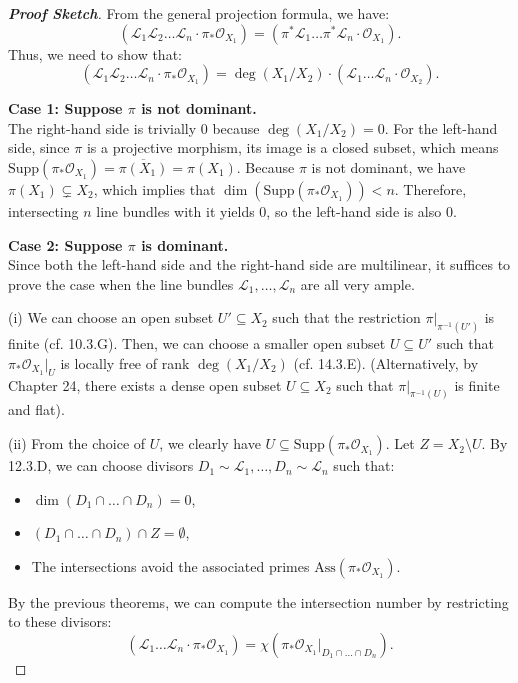 \begin{proof}[\textbf{Proof Sketch}]
From the general projection formula, we have:
\[
(\mathcal{L}_1 \mathcal{L}_2 \dots \mathcal{L}_n \cdot \pi_*\mathcal{O}_{X_1}) = (\pi^*\mathcal{L}_1 \dots \pi^*\mathcal{L}_n \cdot \mathcal{O}_{X_1}).
\]
Thus, we need to show that:
\[
(\mathcal{L}_1 \mathcal{L}_2 \dots \mathcal{L}_n \cdot \pi_*\mathcal{O}_{X_1}) = \deg(X_1/X_2) \cdot (\mathcal{L}_1 \dots \mathcal{L}_n \cdot \mathcal{O}_{X_2}).
\]


\textbf{Case 1: Suppose $\pi$ is not dominant.} \\
The right-hand side is trivially $0$ because $\deg(X_1/X_2) = 0$. For the left-hand side, since $\pi$ is a projective morphism, its image is a closed subset, which means $\text{Supp}(\pi_*\mathcal{O}_{X_1}) = \overline{\pi(X_1)} = \pi(X_1)$. Because $\pi$ is not dominant, we have $\pi(X_1) \subsetneq X_2$, which implies that $\dim(\text{Supp}(\pi_*\mathcal{O}_{X_1})) < n$. Therefore, intersecting $n$ line bundles with it yields $0$, so the left-hand side is also $0$.


\textbf{Case 2: Suppose $\pi$ is dominant.} \\
Since both the left-hand side and the right-hand side are multilinear, it suffices to prove the case when the line bundles $\mathcal{L}_1, \dots, \mathcal{L}_n$ are all very ample.

(i) We can choose an open subset $U' \subseteq X_2$ such that the restriction $\pi|_{\pi^{-1}(U')}$ is finite (cf. 10.3.G). Then, we can choose a smaller open subset $U \subseteq U'$ such that $\pi_*\mathcal{O}_{X_1}|_U$ is locally free of rank $\deg(X_1/X_2)$ (cf. 14.3.E). 
(Alternatively, by Chapter 24, there exists a dense open subset $U \subseteq X_2$ such that $\pi|_{\pi^{-1}(U)}$ is finite and flat).

(ii) From the choice of $U$, we clearly have $U \subseteq \text{Supp}(\pi_*\mathcal{O}_{X_1})$. Let $Z = X_2 \setminus U$. By 12.3.D, we can choose divisors $D_1 \sim \mathcal{L}_1, \dots, D_n \sim \mathcal{L}_n$ such that:
\begin{itemize}
    \item $\dim(D_1 \cap \dots \cap D_n) = 0$,
    \item $(D_1 \cap \dots \cap D_n) \cap Z = \emptyset$,
    \item The intersections avoid the associated primes $\text{Ass}(\pi_*\mathcal{O}_{X_1})$.
\end{itemize}

By the previous theorems, we can compute the intersection number by restricting to these divisors:
\[
(\mathcal{L}_1 \dots \mathcal{L}_n \cdot \pi_*\mathcal{O}_{X_1}) = \chi(\pi_*\mathcal{O}_{X_1}|_{D_1 \cap \dots \cap D_n}).
\]


\end{proof}
